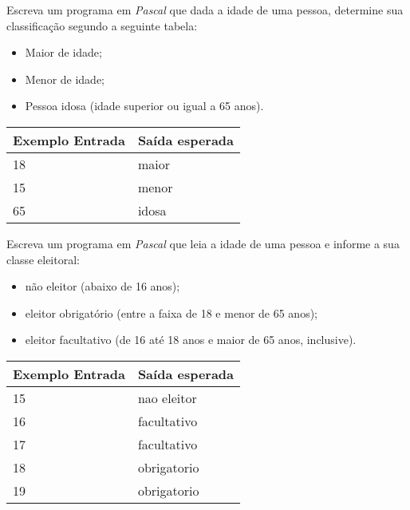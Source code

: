 \item Escreva um programa em \emph{Pascal} que dada a idade de uma pessoa, 
determine sua classificação segundo a seguinte tabela:
\begin{itemize}
\item Maior de idade;
\item Menor de idade;
\item Pessoa idosa (idade superior ou igual a 65 anos).
\end{itemize}

\begin{center}
\begin{tabular}{|l|l|} \hline
Exemplo Entrada & Saída esperada \\ \hline
18                & maior               \\ \hline
15                & menor               \\ \hline
65                & idosa               \\ \hline
\end{tabular}
\end{center}

\item Escreva um programa em \emph{Pascal} que leia a idade de uma pessoa 
e informe a sua classe eleitoral:
\begin{itemize}
\item não eleitor (abaixo de 16 anos);
\item eleitor obrigatório (entre a faixa de 18 e menor de 65 anos);
\item eleitor facultativo (de 16 até 18 anos e maior de 65 anos, inclusive).
\end{itemize}

\begin{center}
\begin{tabular}{|l|l|} \hline
Exemplo Entrada & Saída esperada \\ \hline
15                & nao eleitor               \\ \hline
16                & facultativo               \\ \hline
17                & facultativo               \\ \hline
18                & obrigatorio               \\ \hline
19                & obrigatorio               \\ \hline
\end{tabular}
\end{center}

